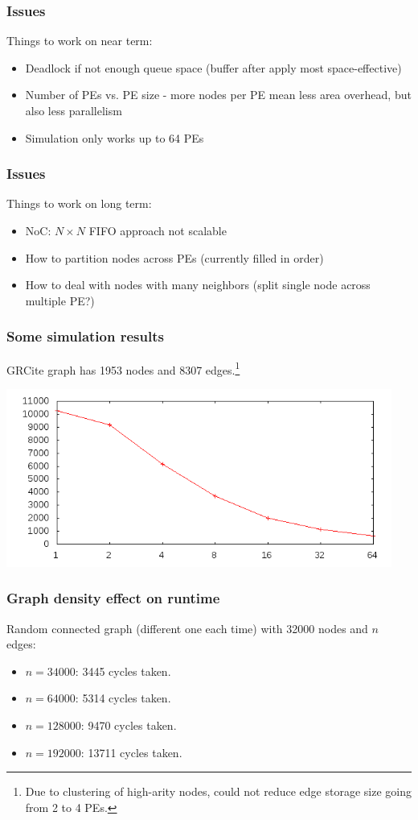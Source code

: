 \documentclass[14pt]{beamer}
\begin{document}
\begin{frame}
	\frametitle{Issues}
	Things to work on near term:
	\vspace{-0.8em}
	\begin{itemize}
		\addtolength{\itemsep}{0.5\baselineskip}
		\item Deadlock if not enough queue space (buffer after apply most space-effective)
		\item Number of PEs vs. PE size - more nodes per PE mean less area overhead, but also less parallelism
		\item Simulation only works up to 64 PEs
	\end{itemize}
\end{frame}

\begin{frame}
	\frametitle{Issues}
	Things to work on long term:
	\vspace{-0.8em}
	\begin{itemize}
		\addtolength{\itemsep}{0.5\baselineskip}
		\item NoC: $N \times N$ FIFO approach not scalable
		\item How to partition nodes across PEs (currently filled in order)
		\item How to deal with nodes with many neighbors (split single node across multiple PE?)
	\end{itemize}
\end{frame}

\begin{frame}
	\frametitle{Some simulation results}
	GRCite graph has 1953 nodes and 8307 edges.\footnote{Due to clustering of high-arity nodes, could not reduce edge storage size going from 2 to 4 PEs.}
	\vspace{-0.8em}
	\begin{center}
	\includegraphics[width=0.95\textwidth]{grcite-numpe.png}
	\end{center}
\end{frame}

\begin{frame}
	\frametitle{Graph density effect on runtime}
	Random connected graph (different one each time) with 32000 nodes and $n$ edges:
	\begin{itemize}
		\addtolength{\itemsep}{0.5\baselineskip}
		\item $n=34000$: 3445 cycles taken.
		\item $n=64000$: 5314 cycles taken.
		\item $n=128000$: 9470 cycles taken.
		\item $n=192000$: 13711 cycles taken.
	\end{itemize}
\end{frame}
\end{document}
